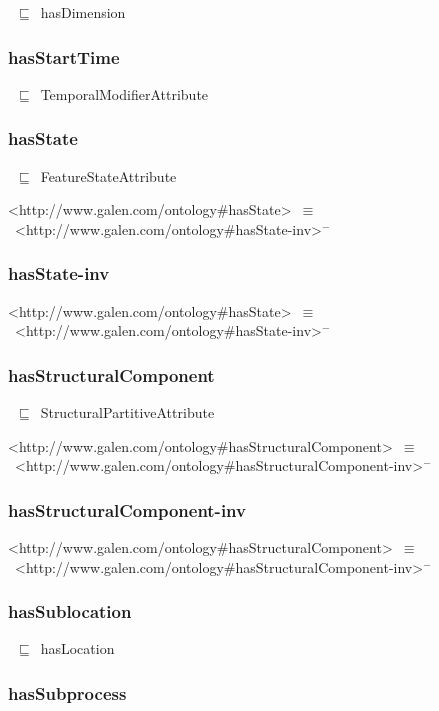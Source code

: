 \documentclass{article}
\begin{document}
~\ensuremath{\sqsubseteq}~hasDimension

\subsubsection*{hasStartTime}

~\ensuremath{\sqsubseteq}~TemporalModifierAttribute

\subsubsection*{hasState}

~\ensuremath{\sqsubseteq}~FeatureStateAttribute

<http://www.galen.com/ontology#hasState>~\ensuremath{\equiv}~<http://www.galen.com/ontology#hasState-inv>\ensuremath{^-}

\subsubsection*{hasState-inv}

<http://www.galen.com/ontology#hasState>~\ensuremath{\equiv}~<http://www.galen.com/ontology#hasState-inv>\ensuremath{^-}

\subsubsection*{hasStructuralComponent}

~\ensuremath{\sqsubseteq}~StructuralPartitiveAttribute

<http://www.galen.com/ontology#hasStructuralComponent>~\ensuremath{\equiv}~<http://www.galen.com/ontology#hasStructuralComponent-inv>\ensuremath{^-}

\subsubsection*{hasStructuralComponent-inv}

<http://www.galen.com/ontology#hasStructuralComponent>~\ensuremath{\equiv}~<http://www.galen.com/ontology#hasStructuralComponent-inv>\ensuremath{^-}

\subsubsection*{hasSublocation}

~\ensuremath{\sqsubseteq}~hasLocation

\subsubsection*{hasSubprocess}
\end{document}
